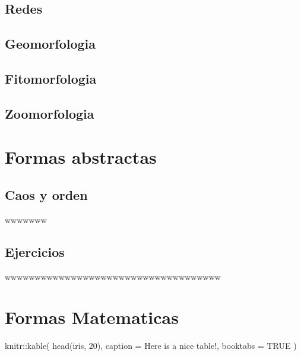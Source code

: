 \documentclass[
  16pt,
]{krantz}
\newenvironment{Shaded}{\begin{snugshade}}{\end{snugshade}}
\newcommand{\AttributeTok}[1]{\textcolor[rgb]{0.77,0.63,0.00}{#1}}
\newcommand{\ConstantTok}[1]{\textcolor[rgb]{0.00,0.00,0.00}{#1}}
\newcommand{\DecValTok}[1]{\textcolor[rgb]{0.00,0.00,0.81}{#1}}
\newcommand{\FunctionTok}[1]{\textcolor[rgb]{0.00,0.00,0.00}{#1}}
\newcommand{\NormalTok}[1]{#1}
\newcommand{\SpecialCharTok}[1]{\textcolor[rgb]{0.00,0.00,0.00}{#1}}
\newcommand{\StringTok}[1]{\textcolor[rgb]{0.31,0.60,0.02}{#1}}
\theoremstyle{definition}
\theoremstyle{definition}
\theoremstyle{definition}
\theoremstyle{definition}
\theoremstyle{remark}
\begin{document}
\hypertarget{redes}{%
\section{Redes}\label{redes}}

\hypertarget{geomorfologia}{%
\section{Geomorfologia}\label{geomorfologia}}

\hypertarget{fitomorfologia}{%
\section{Fitomorfologia}\label{fitomorfologia}}

\hypertarget{zoomorfologia}{%
\section{Zoomorfologia}\label{zoomorfologia}}

\hypertarget{formas-abstractas}{%
\chapter{Formas abstractas}\label{formas-abstractas}}

\hypertarget{caos-y-orden}{%
\section{Caos y orden}\label{caos-y-orden}}

\citep{bookdown2016}wwwwwww \citep{vincze2014college}

\hypertarget{ejercicios}{%
\section{Ejercicios}\label{ejercicios}}

wwwwwwwwwwwwwwwwwwwwwwwwwwwwwwwwwwww

\hypertarget{formas-matematicas}{%
\chapter{Formas Matematicas}\label{formas-matematicas}}

\begin{Shaded}
\begin{Highlighting}[]
\NormalTok{knitr}\SpecialCharTok{::}\FunctionTok{kable}\NormalTok{(}
  \FunctionTok{head}\NormalTok{(iris, }\DecValTok{20}\NormalTok{), }\AttributeTok{caption =} \StringTok{\textquotesingle{}Here is a nice table!\textquotesingle{}}\NormalTok{,}
  \AttributeTok{booktabs =} \ConstantTok{TRUE}
\NormalTok{)}
\end{Highlighting}
\end{Shaded}
\end{document}
